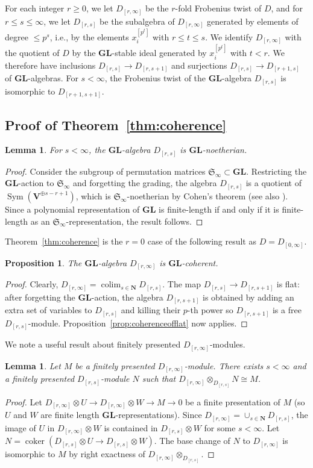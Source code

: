 \documentclass[12pt]{amsart}
\newcommand{\bN}{\mathbf{N}}
\newcommand{\fS}{\mathfrak{S}}
\newcommand{\bV}{\mathbf{V}}
\DeclareMathOperator{\coker}{coker}
\DeclareMathOperator{\Sym}{Sym}
\DeclareMathOperator{\colim}{colim}
\newcommand{\Drs}{D_{[r,s]}}
\newcommand{\Drsp}{D_{[r,s+1]}}
\newcommand{\Drinfty}{D_{[r,\infty]}}
\newcommand{\GL}{\mathbf{GL}}
\numberwithin{equation}{section}
\newtheorem{proposition}[equation]{Proposition}
\newtheorem{lemma}[equation]{Lemma}
\theoremstyle{definition}
\theoremstyle{plain}
\begin{document}
For each integer $r \geq 0$, we let $\Drinfty$ be the $r$-fold Frobenius twist of $D$, and for $r \leq s \leq \infty$, we let $\Drs$ be the subalgebra of $\Drinfty$ generated by elements of degree $\leq p^s$, i.e., by the elements $x_i^{[p^t]}$ with $r \leq t \leq s$. We identify $\Drinfty$ with the quotient of $D$ by the $\GL$-stable ideal generated by $x_i^{[p^t]}$ with $t < r$. We therefore have inclusions $\Drs \to \Drsp$ and surjections $\Drs \to D_{[r+1,s]}$ of $\GL$-algebras. For $s < \infty$, the Frobenius twist of the $\GL$-algebra $\Drs$ is isomorphic to $D_{[r+1, s+1]}$.

\subsection{Proof of Theorem~\ref{thm:coherence}}\label{ss:coherenceD}
\begin{lemma}
    For $s<\infty$, the $\GL$-algebra $\Drs$ is $\GL$-noetherian.
\end{lemma}
\begin{proof}
Consider the subgroup of permutation matrices $\fS_{\infty} \subset \GL$. Restricting the $\GL$-action to $\fS_{\infty}$ and forgetting the grading, the algebra $\Drs$ is a quotient of $\Sym(\bV^{\oplus s - r + 1})$, which is $\fS_{\infty}$-noetherian by Cohen's theorem \cite{co67laws} (see also \cite{nr19fioi}). Since a polynomial representation of $\GL$ is finite-length if and only if it is finite-length as an $\fS_{\infty}$-representation, the result follows.
\end{proof}

Theorem~\ref{thm:coherence} is the $r=0$ case of the following result as $D = D_{[0, \infty]}$. 
\begin{proposition}\label{prop:coherence}
   The $\GL$-algebra $\Drinfty$ is $\GL$-coherent. 
\end{proposition}
\begin{proof}
   Clearly, $\Drinfty = \colim_{s \in \mathbf{N}} \Drs$. The map $\Drs \to \Drsp$ is flat: after forgetting the $\GL$-action, the algebra $\Drsp$ is obtained by adding an extra set of variables to $\Drs$ and killing their $p$-th power so $\Drsp$ is a free $\Drs$-module. Proposition~\ref{prop:coherenceofflat} now applies.
\end{proof}

We note a useful result about finitely presented $\Drinfty$-modules.
\begin{lemma} \label{lem:finitebase}
    Let $M$ be a finitely presented $\Drinfty$-module. There exists $s<\infty$ and a finitely presented $\Drs$-module $N$ such that $\Drinfty \otimes_{\Drs} N \cong M$.
\end{lemma}
\begin{proof}
Let $\Drinfty \otimes U \to \Drinfty \otimes W \to M \to 0$ be a finite presentation of $M$ (so $U$ and $W$ are finite length $\GL$-representations). Since $\Drinfty = \cup_{s \in \bN} \Drs$, the image of $U$ in $\Drinfty \otimes W$ is contained in $\Drs \otimes W$ for some $s < \infty$. Let $N = \coker(\Drs \otimes U \to \Drs \otimes W)$. The base change of $N$ to $\Drinfty$ is isomorphic to $M$ by right exactness of $\Drinfty \otimes_{\Drs}$.
\end{proof}
\end{document}
